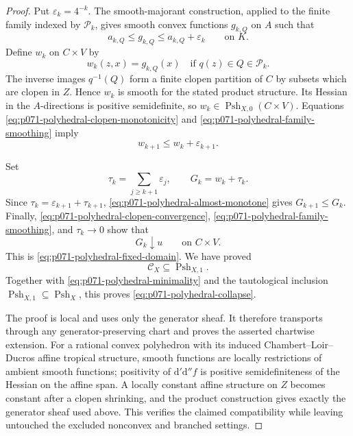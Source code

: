 \begin{proof}
Put \(\varepsilon_k=4^{-k}\).  The smooth-majorant construction, applied
to the finite family indexed by \(\mathcal P_k\), gives smooth convex
functions \(g_{k,Q}\) on \(A\) such that
\begin{equation}
                        a_{k,Q}\leq g_{k,Q}
                        \leq a_{k,Q}+\varepsilon_k
                        \qquad\text{on }K.
 \label{eq:p071-polyhedral-family-smoothing}
\end{equation}
Define \(w_k\) on \(C\times V\) by
\begin{equation}
                 w_k(z,x)=g_{k,Q}(x)
                 \quad\text{if }q(z)\in Q\in\mathcal P_k.
 \label{eq:p071-polyhedral-smooth-piecewise}
\end{equation}
The inverse images \(q^{-1}(Q)\) form a finite clopen partition of \(C\)
by subsets which are clopen in \(Z\).  Hence \(w_k\) is smooth for the
stated product structure.  Its Hessian in the \(A\)-directions is positive
semidefinite, so \(w_k\in\operatorname{Psh}_{X,0}(C\times V)\).
Equations \eqref{eq:p071-polyhedral-clopen-monotonicity} and
\eqref{eq:p071-polyhedral-family-smoothing} imply
\begin{equation}
                             w_{k+1}\leq w_k+\varepsilon_{k+1}.
 \label{eq:p071-polyhedral-almost-monotone}
\end{equation}

Set
\[
                 \tau_k=\sum_{j\geq k+1}\varepsilon_j,
                 \qquad G_k=w_k+\tau_k .
\]
Since \(\tau_k=\varepsilon_{k+1}+\tau_{k+1}\),
\eqref{eq:p071-polyhedral-almost-monotone} gives
\(G_{k+1}\leq G_k\).  Finally,
\eqref{eq:p071-polyhedral-clopen-convergence},
\eqref{eq:p071-polyhedral-family-smoothing}, and
\(\tau_k\to0\) show that
\[
                         G_k\downarrow u
                         \qquad\text{on }C\times V.
\]
This is \eqref{eq:p071-polyhedral-fixed-domain}.  We have proved
\[
                         \mathscr C_X
                         \subseteq\operatorname{Psh}_{X,1}.
\]
Together with \eqref{eq:p071-polyhedral-minimality} and the tautological
inclusion
\(\operatorname{Psh}_{X,1}\subseteq\operatorname{Psh}_X\), this proves
\eqref{eq:p071-polyhedral-collapse}.

The proof is local and uses only the generator sheaf.  It therefore
transports through any generator-preserving chart and proves the asserted
chartwise extension.  For a rational convex polyhedron with its induced
Chambert--Loir--Ducros affine tropical structure, smooth functions are
locally restrictions of ambient smooth functions; positivity of
\(\mathrm d'\mathrm d''f\) is positive semidefiniteness of the Hessian on
the affine span.  A locally constant affine structure on \(Z\) becomes
constant after a clopen shrinking, and the product construction gives
exactly the generator sheaf used above.  This verifies the claimed
compatibility while leaving untouched the excluded nonconvex and branched
settings.
\end{proof}
